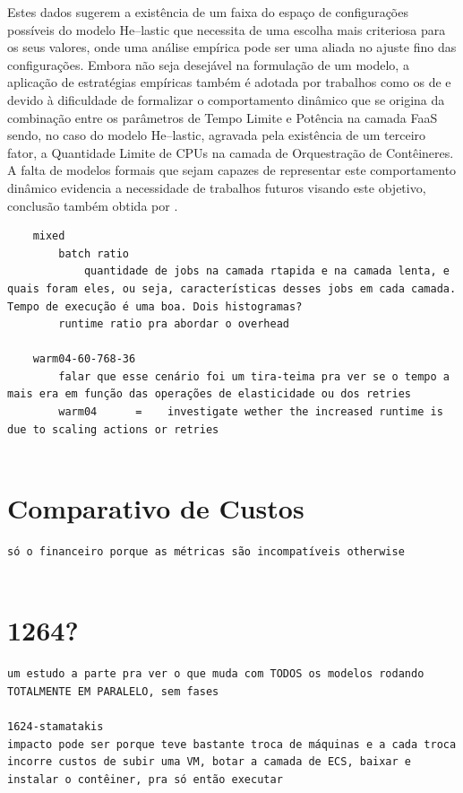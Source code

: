 \documentclass[english,brazilian]{UNISINOSmonografia} %
\begin{document}
Estes dados sugerem a existência de um faixa do espaço de configurações possíveis do modelo \textsf{He}--lastic que necessita de uma escolha mais criteriosa para os seus valores, onde uma análise empírica pode ser uma aliada no ajuste fino das configurações.
%
Embora não seja desejável na formulação de um modelo, a aplicação de estratégias empíricas também é adotada por trabalhos como os de  e  devido à dificuldade de formalizar o comportamento dinâmico que se origina da combinação entre os parâmetros de Tempo Limite e Potência na camada FaaS sendo, no caso do modelo \textsf{He}--lastic, agravada pela existência de um terceiro fator, a Quantidade Limite de CPUs na camada de Orquestração de Contêineres.
%
A falta de modelos formais que sejam capazes de representar este comportamento dinâmico evidencia a necessidade de trabalhos futuros visando este objetivo, conclusão também obtida por .




\begin{verbatim}
	mixed
		batch ratio
			quantidade de jobs na camada rtapida e na camada lenta, e quais foram eles, ou seja, características desses jobs em cada camada. Tempo de execução é uma boa. Dois histogramas?
		runtime ratio pra abordar o overhead
	
	warm04-60-768-36
		falar que esse cenário foi um tira-teima pra ver se o tempo a mais era em função das operações de elasticidade ou dos retries
		warm04		=	 investigate wether the increased runtime is due to scaling actions or retries
	
\end{verbatim}

\section{Comparativo de Custos}

\begin{verbatim}
só o financeiro porque as métricas são incompatíveis otherwise


\end{verbatim}

\section{1264?}

\begin{verbatim}
um estudo a parte pra ver o que muda com TODOS os modelos rodando TOTALMENTE EM PARALELO, sem fases

1624-stamatakis
impacto pode ser porque teve bastante troca de máquinas e a cada troca incorre custos de subir uma VM, botar a camada de ECS, baixar e instalar o contêiner, pra só então executar
\end{verbatim}
\end{document}
